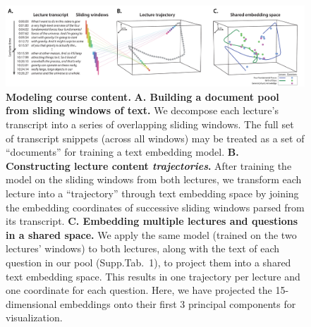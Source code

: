 \documentclass[10pt]{article}
\newcommand{\questions}{1}
\providecommand{\DIFaddtex}[1]{{\protect\color{blue}\uwave{#1}}} %
\providecommand{\DIFaddFL}[1]{\DIFadd{#1}} %
\providecommand{\DIFaddbeginFL}{} %
\providecommand{\DIFaddendFL}{} %
\providecommand{\DIFadd}[1]{\texorpdfstring{\DIFaddtex{#1}}{#1}} %
\newcommand{\DIFaddincludegraphics}[2][]{{\color{blue}\fbox{\DIFOincludegraphics[#1]{#2}}}} %
\DeclareRobustCommand{\DIFaddbeginFL}{\DIFOaddbeginFL \let\includegraphics\DIFaddincludegraphics} %
\DeclareRobustCommand{\DIFaddendFL}{\DIFOaddendFL \let\includegraphics\DIFOincludegraphics} %
\begin{document}
\begin{figure}[tp]
    \centering
    \includegraphics[width=\textwidth]{figs/sliding_windows}

    \caption{\textbf{Modeling course content.} \textbf{A. Building a document
    pool from sliding windows of text.} We decompose each lecture's transcript
    into a series of overlapping sliding windows. The full set of transcript
    snippets (across all windows) may be treated as a set of ``documents'' for
    training a text embedding model. \textbf{B. Constructing lecture content
    \textit{trajectories}.} After training the model on the sliding windows
    from both lectures, we transform each lecture into a ``trajectory'' through
    text embedding space by joining the embedding coordinates of successive
    sliding windows parsed from its transcript. \textbf{C. Embedding multiple
    lectures and questions in a shared space.} We apply the same model (trained
    on the two lectures' windows) to both lectures, along with the text of each
    question in our pool (Supp.\DIFaddbeginFL \DIFaddFL{~}\DIFaddendFL Tab.~\questions), to project them into a shared
    text embedding space. This results in one trajectory per lecture and one
    coordinate for each question. Here, we have projected the 15-dimensional
    embeddings onto their first 3 principal components for visualization.}

    \label{fig:sliding-windows}
\end{figure}
\end{document}

